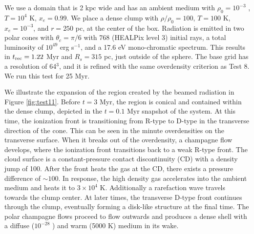 \documentclass[useAMS,usenatbib,a4paper]{mn2e}
\begin{document}
We use a domain that is 2 kpc wide and has an ambient medium with
$\rho_0 = 10^{-3}$ \cubecm, $T = 10^4$ K, $x_e = 0.99$.  We place a
dense clump with $\rho/\rho_0 = 100$, $T = 100$ K, $x_e = 10^{-3}$,
and $r = 250$ pc, at the center of the box.  Radiation is emitted in
two polar cones with $\theta_c = \pi/6$ with 768 (HEALPix level 3)
initial rays, a total luminosity of $10^{49}$ erg s$^{-1}$, and a 17.6
eV mono-chromatic spectrum.  This results in $t_{\rm rec} = 1.22$ Myr
and $R_s = 315$ pc, just outside of the sphere.  The base grid has a
resolution of 64$^3$, and it is refined with the same overdensity
criterion as Test 8.  We run this test for 25 Myr.

We illustrate the expansion of the \hii region created by the
beamed radiation in Figure \ref{fig:test11}.  Before $t = 3$ Myr, the
\hii region is conical and contained within the dense clump,
depicted in the $t = 0.1$ Myr snapshot of the system.  At this time,
the ionization front is transitioning from R-type to D-type in the
transverse direction of the cone.  This can be seen in the minute
overdensities on the \hii transverse surface.  When it breaks
out of the overdensity, a champagne flow develops, where the
ionization front transitions back to a weak R-type front.  The cloud
surface is a constant-pressure contact discontinuity (CD) with a
density jump of 100.  After the front heats the gas at the CD, there
exists a pressure difference of $\sim 100$.  In response, the high
density gas accelerates into the ambient medium and heats it to $3
\times 10^4$ K.  Additionally a rarefaction wave travels towards the
clump center.  At later times, the transverse D-type front continues
through the clump, eventually forming a disk-like structure at the
final time.  The polar champagne flows proceed to flow outwards and
produces a dense shell with a diffuse ($10^{-28}$ \cubecm) and warm
(5000 K) medium in its wake.

% 
\end{document}
